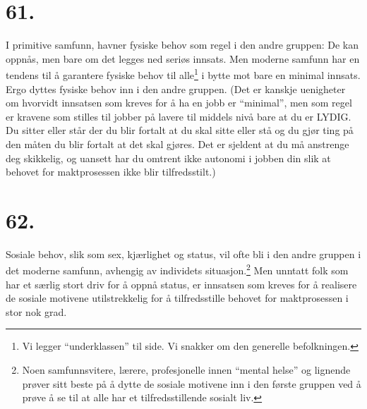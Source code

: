 \documentclass[oneside]{book}
\begin{document}
\section*{61.}
I primitive samfunn, havner fysiske behov som regel i den andre gruppen: De kan
oppnås, men bare om det legges ned seriøs innsats. Men moderne samfunn har en
tendens til å garantere fysiske behov til alle\footnote{Vi legger
``underklassen'' til side. Vi snakker om den generelle befolkningen.} i bytte
mot bare en minimal innsats. Ergo dyttes fysiske behov inn i den andre gruppen.
(Det er kanskje uenigheter om hvorvidt innsatsen som kreves for å ha en jobb er
``minimal'', men som regel er kravene som stilles til jobber på lavere til
middels nivå bare at du er LYDIG. Du sitter eller står der du blir fortalt at
du skal sitte eller stå og du gjør ting på den måten du blir fortalt at det
skal gjøres. Det er sjeldent at du må anstrenge deg skikkelig, og uansett har
du omtrent ikke autonomi i jobben din slik at behovet for maktprosessen ikke
blir tilfredsstilt.)

\section*{62.}
Sosiale behov, slik som sex, kjærlighet og status, vil ofte bli i den andre
gruppen i det moderne samfunn, avhengig av individets situasjon.\footnote{Noen
samfunnsvitere, lærere, profesjonelle innen ``mental helse'' og lignende prøver
sitt beste på å dytte de sosiale motivene inn i den første gruppen ved å prøve å
se til at alle har et tilfredsstillende sosialt liv.} Men unntatt
folk som har et særlig stort driv for å oppnå status, er innsatsen som kreves
for å realisere de sosiale motivene utilstrekkelig for å tilfredsstille behovet
for maktprosessen i stor nok grad.
\end{document}
